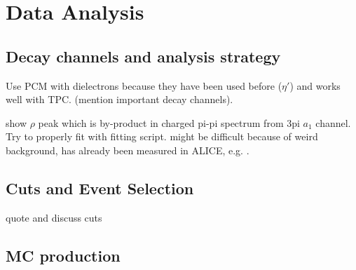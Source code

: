 \section{Data Analysis}
\label{sec:Analysis}

\subsection{Decay channels and analysis strategy}
Use PCM with dielectrons because they have been used before ($\eta'$) and works well with TPC. (mention important decay channels).

show $\rho$ peak which is by-product in charged pi-pi spectrum from 3pi $a_1$ channel. Try to properly fit with fitting script. might be difficult because of weird background, has already been measured in ALICE, e.g. \cite{ALICErho}.

\subsection{Cuts and Event Selection}
quote and discuss cuts

\subsection{MC production}
